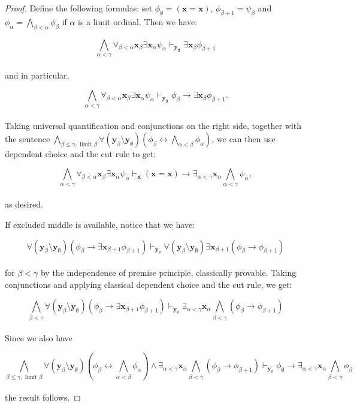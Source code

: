 \documentclass[a4paper,11pt]{article}
\theoremstyle{plain}
\theoremstyle{plain}
\theoremstyle{remark}
\begin{document}
\begin{proof}
Define the following formulas: set $\phi_{\emptyset}= (\mathbf{x}=\mathbf{x})$, $\phi_{\beta +1}=\psi_{\beta}$ and $\phi_{\alpha}=\bigwedge_{\beta < \alpha} \phi_{\beta}$ if $\alpha$ is a limit ordinal. Then we have:

$$\bigwedge_{\alpha < \gamma} \forall_{\beta < \alpha}\mathbf{x}_{\beta} \exists \mathbf{x}_{\alpha} \psi_{\alpha} \vdash_{\mathbf{y_{\beta}}} \exists \mathbf{x}_{\beta} \phi_{\beta +1}$$
\\
and in particular,

$$\bigwedge_{\alpha < \gamma} \forall_{\beta < \alpha}\mathbf{x}_{\beta} \exists \mathbf{x}_{\alpha} \psi_{\alpha} \vdash_{\mathbf{y_{\beta}}} \phi_{\beta} \to \exists \mathbf{x}_{\beta} \phi_{\beta +1}.$$
\\
Taking universal quantification and conjunctions on the right side, together with the sentence $\bigwedge_{\beta \leq \gamma, \text{ limit }\beta} \forall (\mathbf{y}_{\beta} \setminus \mathbf{y}_{\emptyset}) \left(\phi_{\beta} \leftrightarrow \bigwedge_{\alpha<\beta}\phi_{\alpha} \right)$, we can then use dependent choice and the cut rule to get:

$$\bigwedge_{\alpha < \gamma} \forall_{\beta < \alpha}\mathbf{x}_{\beta} \exists \mathbf{x}_{\alpha} \psi_{\alpha} \vdash_{\mathbf{x}} (\mathbf{x}=\mathbf{x}) \to \exists_{\alpha < \gamma} \mathbf{x}_{\alpha} \bigwedge_{\alpha < \gamma} \psi_{\alpha},$$
\\
as desired.

If excluded middle is available, notice that we have:

$$\forall (\mathbf{y}_{\beta} \setminus \mathbf{y}_{\emptyset}) \left(\phi_{\beta} \to \exists \mathbf{x}_{\beta +1} \phi_{\beta +1} \right) \vdash_{\mathbf{y}_{\emptyset}} \forall (\mathbf{y}_{\beta} \setminus \mathbf{y}_{\emptyset}) \exists \mathbf{x}_{\beta +1} \left(\phi_{\beta} \to \phi_{\beta +1} \right)$$
\\
for $\beta < \gamma$ by the independence of premise principle, classically provable. Taking conjunctions and applying classical dependent choice and the cut rule, we get:

$$\bigwedge_{\beta < \gamma} \forall (\mathbf{y}_{\beta} \setminus \mathbf{y}_{\emptyset}) \left(\phi_{\beta} \to \exists \mathbf{x}_{\beta +1} \phi_{\beta +1} \right) \vdash_{\mathbf{y}_{\emptyset}} \exists_{\alpha < \gamma} \mathbf{x}_{\alpha} \bigwedge_{\beta<\gamma} \left(\phi_{\beta} \to \phi_{\beta +1} \right)$$
\\
Since we also have 

$$\bigwedge_{\beta \leq \gamma, \text{ limit }\beta} \forall (\mathbf{y}_{\beta} \setminus \mathbf{y}_{\emptyset}) \left(\phi_{\beta} \leftrightarrow \bigwedge_{\alpha<\beta}\phi_{\alpha} \right) \wedge \exists_{\alpha < \gamma} \mathbf{x}_{\alpha} \bigwedge_{\beta<\gamma} \left(\phi_{\beta} \to \phi_{\beta +1} \right) \vdash_{\mathbf{y}_{\emptyset}} \phi_{\emptyset} \to \exists_{\alpha < \gamma} \mathbf{x}_{\alpha} \bigwedge_{\beta<\gamma} \phi_{\beta}$$
\\
the result follows.
\end{proof}
\end{document}
